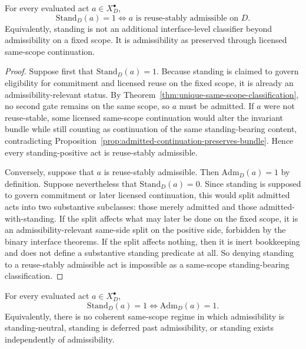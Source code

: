 \begin{theorem}
\label{thm:standing-emergence}
For every evaluated act $a\in X_D^{\bullet}$,
\[
\mathrm{Stand}_D(a)=1 \iff a \text{ is reuse-stably admissible on } D.
\]
Equivalently, standing is not an additional interface-level classifier beyond admissibility on a fixed scope. It is admissibility as preserved through licensed same-scope continuation.
\end{theorem}

\begin{proof}
Suppose first that $\mathrm{Stand}_D(a)=1$. Because standing is claimed to govern eligibility for commitment and licensed reuse on the fixed scope, it is already an admissibility-relevant status. By Theorem~\ref{thm:unique-same-scope-classification}, no second gate remains on the same scope, so $a$ must be admitted. If $a$ were not reuse-stable, some licensed same-scope continuation would alter the invariant bundle while still counting as continuation of the same standing-bearing content, contradicting Proposition~\ref{prop:admitted-continuation-preserves-bundle}. Hence every standing-positive act is reuse-stably admissible.

Conversely, suppose that $a$ is reuse-stably admissible. Then $\mathrm{Adm}_D(a)=1$ by definition. Suppose nevertheless that $\mathrm{Stand}_D(a)=0$. Since standing is supposed to govern commitment or later licensed continuation, this would split admitted acts into two substantive subclasses: those merely admitted and those admitted-with-standing. If the split affects what may later be done on the fixed scope, it is an admissibility-relevant same-side split on the positive side, forbidden by the binary interface theorems. If the split affects nothing, then it is inert bookkeeping and does not define a substantive standing predicate at all. So denying standing to a reuse-stably admissible act is impossible as a same-scope standing-bearing classification.\cite{MaleyNecessity}
\end{proof}

\begin{theorem}
\label{thm:standing-admissibility-equivalence}
For every evaluated act $a\in X_D^{\bullet}$,
\[
\mathrm{Stand}_D(a)=1 \iff \mathrm{Adm}_D(a)=1.
\]
Equivalently, there is no coherent same-scope regime in which admissibility is standing-neutral, standing is deferred past admissibility, or standing exists independently of admissibility.
\end{theorem}

